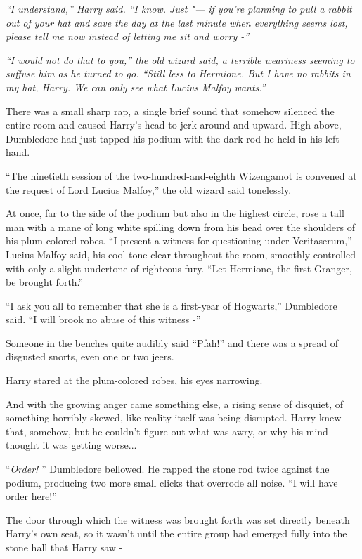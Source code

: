 \emph{``I understand,'' Harry said. ``I know. Just "--- if you're planning
to pull a rabbit out of your hat and save the day at the last minute
when everything seems lost, please tell me now instead of letting me sit
and worry -''}

\emph{``I would not do that to you,'' the old wizard said, a terrible
weariness seeming to suffuse him as he turned to go. ``Still less to
Hermione. But I have no rabbits in my hat, Harry. We can only see what
Lucius Malfoy wants.''}

There was a small sharp rap, a single brief sound that somehow silenced
the entire room and caused Harry's head to jerk around and upward. High
above, Dumbledore had just tapped his podium with the dark rod he held
in his left hand.

``The ninetieth session of the two-hundred-and-eighth Wizengamot is
convened at the request of Lord Lucius Malfoy,'' the old wizard said
tonelessly.

At once, far to the side of the podium but also in the highest circle,
rose a tall man with a mane of long white spilling down from his head
over the shoulders of his plum-colored robes. ``I present a witness for
questioning under Veritaserum,'' Lucius Malfoy said, his cool tone clear
throughout the room, smoothly controlled with only a slight undertone of
righteous fury. ``Let Hermione, the first Granger, be brought forth.''

``I ask you all to remember that she is a first-year of Hogwarts,''
Dumbledore said. ``I will brook no abuse of this witness -''

Someone in the benches quite audibly said ``Pfah!'' and there was a
spread of disgusted snorts, even one or two jeers.

Harry stared at the plum-colored robes, his eyes narrowing.

And with the growing anger came something else, a rising sense of
disquiet, of something horribly skewed, like reality itself was being
disrupted. Harry knew that, somehow, but he couldn't figure out what was
awry, or why his mind thought it was getting worse...

``\emph{Order!} '' Dumbledore bellowed. He rapped the stone rod twice
against the podium, producing two more small clicks that overrode all
noise. ``I will have order here!''

The door through which the witness was brought forth was set directly
beneath Harry's own seat, so it wasn't until the entire group had
emerged fully into the stone hall that Harry saw -

